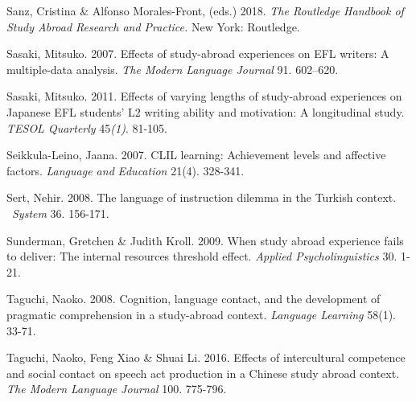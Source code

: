 \begin{styleStandard}
Sanz, Cristina \& Alfonso Morales-Front, (eds.) 2018. \textit{The Routledge Handbook of Study Abroad Research and Practice. }New York: Routledge. 
\end{styleStandard}


\begin{styleStandard}
Sasaki, Mitsuko. 2007. Effects of study-abroad experiences on EFL writers: A multiple-data analysis. \textit{The Modern Language Journal}\textit{ }91. 602–620.
\end{styleStandard}


\begin{styleStandard}
Sasaki, Mitsuko. 2011. Effects of varying lengths of study-abroad experiences on Japanese EFL students’ L2 writing ability and motivation: A longitudinal study. \textit{TESOL Quarterly} 45\textit{(1)}. 81-105.
\end{styleStandard}


\begin{styleStandard}
Seikkula-Leino, Jaana. 2007. CLIL learning: Achievement levels and affective factors. \textit{Language and }\textit{Education} 21(4). 328-341.
\end{styleStandard}


\begin{styleStandard}
Sert, Nehir. 2008. The language of instruction dilemma in the Turkish context. \ \textit{System }36. 156-171.
\end{styleStandard}


\begin{styleStandard}
Sunderman, Gretchen \& Judith Kroll. 2009. When study abroad experience fails to deliver: The internal resources threshold effect. \textit{Applied Psycholinguistics }30. 1-21.
\end{styleStandard}


\begin{styleStandard}
Taguchi, Naoko. 2008. Cognition, language contact, and the development of pragmatic comprehension in a study-abroad context. \textit{Language Learning }58(1). 33-71. 
\end{styleStandard}


\begin{styleStandard}
Taguchi, Naoko, Feng Xiao \& Shuai Li. 2016. Effects of intercultural competence and social contact on speech act production in a Chinese study abroad context. \textit{The Modern Language Journal} 100. 775-796.
\end{styleStandard}



